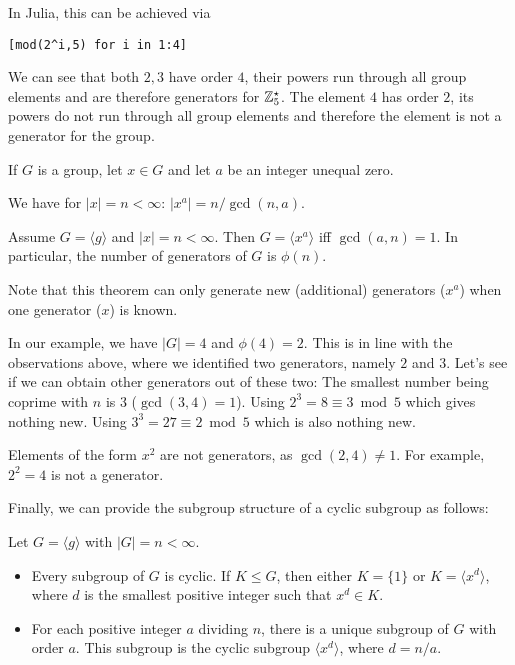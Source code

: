 In Julia, this can be achieved via

\begin{verbatim}
[mod(2^i,5) for i in 1:4]
\end{verbatim}

We can see that both $2, 3$ have order $4$, their powers run through all group elements and are therefore generators for $\mathbb{Z}_5^\star$. The element $4$ has order $2$, its powers do not run through all group elements and therefore the element is not a generator for the group.

\begin{theorem}
	If $G$ is a group, let $x \in G$ and let $a$ be an integer unequal zero.

	We have for $|x| = n < \infty$: $|x^a| = n / \gcd(n,a)$.

	Assume $G = \langle g \rangle$ and $|x| = n < \infty$. Then $G = \langle x^a \rangle$ iff $\gcd(a,n) = 1$. In particular, the number of generators of $G$ is $\phi(n)$.

\end{theorem}

Note that this theorem can only generate new (additional) generators ($x^a$) when one generator ($x$) is known.

In our example, we have $|G| = 4$ and $\phi(4) = 2$. This is in line with the observations above, where we identified two generators, namely $2$ and $3$. Let's see if we can obtain other generators out of these two: The smallest number being coprime with $n$ is $3$ ($\gcd(3,4) = 1$). Using $2^3 = 8 \equiv 3 \bmod 5$ which gives nothing new. Using $3^3 = 27 \equiv 2 \bmod 5$ which is also nothing new.

Elements of the form $x^2$ are not generators, as $\gcd(2,4) \neq 1$. For example, $2^2 = 4$ is not a generator.

Finally, we can provide the subgroup structure of a cyclic subgroup as follows:

\begin{theorem}
	Let $G = \langle g \rangle$ with $|G| = n < \infty$.
	\begin{itemize}
		\item Every subgroup of $G$ is cyclic. If $K \leq G$, then either $K = \{1\}$ or $K = \langle x^d \rangle$, where $d$ is the smallest positive integer such that $x^d \in K$.
		\item For each positive integer $a$ dividing $n$, there is a unique subgroup of $G$ with order $a$. This subgroup is the cyclic subgroup $\langle x^d \rangle$, where $d = n / a$.
	\end{itemize}
\end{theorem}

